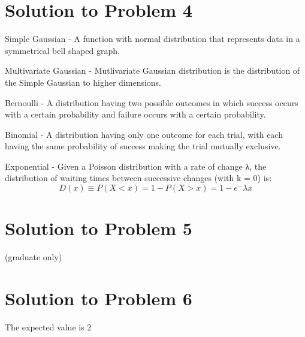 \documentclass[a4paper]{article}
\begin{document}
\section{Solution to Problem 4}

Simple Gaussian - A function with normal distribution that represents data in a symmetrical bell shaped graph.

Multivariate Gaussian - Mutlivariate Gaussian distribution is the distribution of the Simple Gaussian to higher dimensions. 

Bernoulli - A distribution having two possible outcomes in which success occurs with a certain probability and failure occurs with a certain probability.

Binomial - A distribution having only one outcome for each trial, with each having the same probability of success making the trial mutually exclusive. 

Exponential - Given a Poisson distribution with a rate of change λ, the distribution of waiting times between successive changes (with k = 0) is:
\begin{equation}
D(x) \equiv P (X < x)
	= 1 - P (X > x)
	= 1 - e^-λx
\end{equation}

\section {Solution to Problem 5}

(graduate only)

\section{Solution to Problem 6}

The expected value is 2
\end{document}

